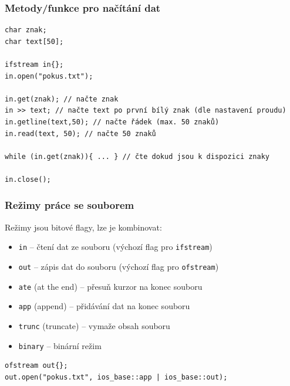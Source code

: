 \begin{frame}[fragile]
\frametitle{Metody/funkce pro načítání dat}
\begin{yesblock}
\begin{lstlisting}[basicstyle=\small]
char znak; 
char text[50]; 

ifstream in{}; 
in.open("pokus.txt"); 

in.get(znak); // načte znak
in >> text; // načte text po první bílý znak (dle nastavení proudu)
in.getline(text,50); // načte řádek (max. 50 znaků)
in.read(text, 50); // načte 50 znaků

while (in.get(znak)){ ... } // čte dokud jsou k dispozici znaky

in.close(); 
\end{lstlisting}
\end{yesblock}
\end{frame}





\begin{frame}[fragile]
\frametitle{Režimy práce se souborem}

\begin{block}{}
Režimy jsou bitové flagy, lze je kombinovat:
\begin{itemize}
\item \lstinline|in| -- čtení dat ze souboru (výchozí flag pro \lstinline|ifstream|)
\item \lstinline|out| -- zápis dat do souboru (výchozí flag pro \lstinline|ofstream|)
\item \lstinline|ate| (at the end) -- přesuň kurzor na konec souboru
\item \lstinline|app| (append) -- přidávání dat na konec souboru
\item \lstinline|trunc| (truncate) -- vymaže obsah souboru
\item \lstinline|binary| -- binární režim
\end{itemize}
\end{block}

\begin{yesblock}
\begin{lstlisting}
ofstream out{}; 
out.open("pokus.txt", ios_base::app | ios_base::out);
\end{lstlisting}
\end{yesblock}
\end{frame}







